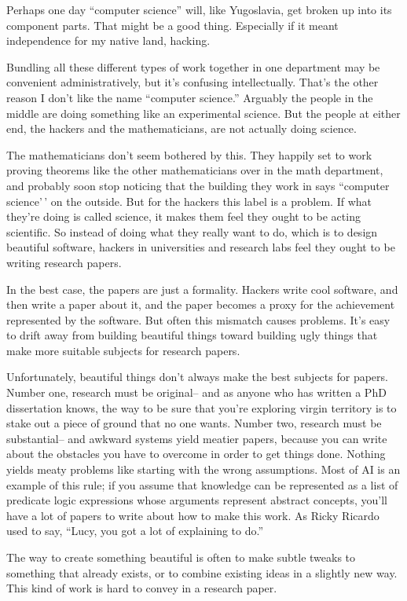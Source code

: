 \documentclass[12pt]{book}
\begin{document}
Perhaps one day ``computer science'' will, like Yugoslavia, get broken
up into its component parts. That might be a good thing. Especially if
it meant independence for my native land, hacking.

Bundling all these different types of work together in one department
may be convenient administratively, but it's confusing intellectually.
That's the other reason I don't like the name ``computer science.''
Arguably the people in the middle are doing something like an
experimental science. But the people at either end, the hackers and the
mathematicians, are not actually doing science.

The mathematicians don't seem bothered by this. They happily set to work
proving theorems like the other mathematicians over in the math
department, and probably soon stop noticing that the building they work
in says ``computer science'\,' on the outside. But for the hackers this
label is a problem. If what they're doing is called science, it makes
them feel they ought to be acting scientific. So instead of doing what
they really want to do, which is to design beautiful software, hackers
in universities and research labs feel they ought to be writing research
papers.

In the best case, the papers are just a formality. Hackers write cool
software, and then write a paper about it, and the paper becomes a proxy
for the achievement represented by the software. But often this mismatch
causes problems. It's easy to drift away from building beautiful things
toward building ugly things that make more suitable subjects for
research papers.

Unfortunately, beautiful things don't always make the best subjects for
papers. Number one, research must be original-- and as anyone who has
written a PhD dissertation knows, the way to be sure that you're
exploring virgin territory is to stake out a piece of ground that no one
wants. Number two, research must be substantial-- and awkward systems
yield meatier papers, because you can write about the obstacles you have
to overcome in order to get things done. Nothing yields meaty problems
like starting with the wrong assumptions. Most of AI is an example of
this rule; if you assume that knowledge can be represented as a list of
predicate logic expressions whose arguments represent abstract concepts,
you'll have a lot of papers to write about how to make this work. As
Ricky Ricardo used to say, ``Lucy, you got a lot of explaining to do.''

The way to create something beautiful is often to make subtle tweaks to
something that already exists, or to combine existing ideas in a
slightly new way. This kind of work is hard to convey in a research
paper.
\end{document}
